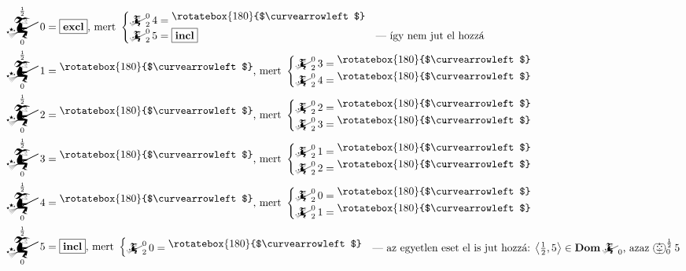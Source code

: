 \documentclass{article}
\newcommand{\nothing}{\text{\raisebox{0.4em}{\rotatebox{180}{$\curvearrowleft$}}}}%
\newcommand{\just}[1]{\boxed{#1}}%
\DeclareMathOperator{\dom}{\mathbf{Dom}}
\newcommand{\incl}{\mathbf{incl}}
\newcommand{\excl}{\mathbf{excl}}
\newcommand{\angled}[1]{\left\langle#1\right\rangle}
\newcommand{\mainfun}[3]{\mathwitch_{#1}^{#2}#3}
\newcommand{\yesmainfun}[3]{\bigpumpkin_{#1}^{#2}#3}
\newcommand{\currymainfun}[1]{\mathwitch_{#1}}
\begin{document}
	\begin{align*}
		\mainfun0{\frac12}0  &= \just \excl \text{, mert }\begin{cases}\mainfun2{0}4 = \nothing\\\mainfun2{0}5 = \just \incl&\text{--- így nem jut el hozzá}\end{cases} \\
		\mainfun0{\frac12}1  &= \nothing    \text{, mert }\begin{cases}\mainfun2{0}3 = \nothing\\\mainfun2{0}4 = \nothing&\end{cases} \\
		\mainfun0{\frac12}2  &= \nothing    \text{, mert }\begin{cases}\mainfun2{0}2 = \nothing\\\mainfun2{0}3 = \nothing&\end{cases} \\
		\mainfun0{\frac12}3  &= \nothing    \text{, mert }\begin{cases}\mainfun2{0}1 = \nothing\\\mainfun2{0}2 = \nothing&\end{cases} \\
		\mainfun0{\frac12}4  &= \nothing    \text{, mert }\begin{cases}\mainfun2{0}0 = \nothing\\\mainfun2{0}1 = \nothing&\end{cases} \\
		\mainfun0{\frac12}5  &= \just \incl \text{, mert }\begin{cases}\mainfun2{0}0 = \nothing&\text{--- az egyetlen eset el is jut hozzá: $\angled{\frac12,5}\in\dom\currymainfun0$, azaz $\yesmainfun0{\frac12}5$}\end{cases}
	\end{align*}
\end{document}
